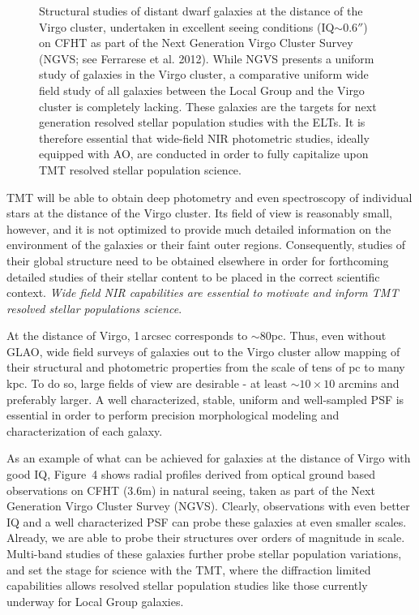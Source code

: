 \begin{figure*}
  \begin{center}
    \caption{Structural studies of distant dwarf galaxies at the
   distance of the Virgo cluster, undertaken in excellent seeing
   conditions (IQ$\sim0.6''$) on CFHT as part of the Next Generation
   Virgo Cluster Survey (NGVS; see Ferrarese et al. 2012). While NGVS
   presents a uniform study of galaxies in the Virgo cluster, a
   comparative uniform wide field study of all galaxies between the
   Local Group and the Virgo cluster is completely lacking. These
   galaxies are the targets for next generation resolved stellar
   population studies with the ELTs. It is therefore essential that
   wide-field NIR photometric studies, ideally equipped with AO, are
   conducted in order to fully capitalize upon TMT resolved stellar
   population science.} 
  \end{center}
\end{figure*}

TMT will be able to obtain deep photometry and even spectroscopy of
individual stars at the distance of the Virgo cluster. Its field of view
is reasonably small, however, and it is not optimized to provide much
detailed information on the environment of the galaxies or their faint
outer regions. Consequently, studies of their global structure need to
be obtained elsewhere in order for forthcoming detailed studies of their
stellar content to be placed in the correct scientific context. {\it
Wide field NIR capabilities are essential to motivate and inform TMT
resolved stellar populations science}. 

At the distance of Virgo, 1\,arcsec corresponds to $\sim 80$pc. Thus,
even without GLAO, wide field surveys of galaxies out to the Virgo
cluster allow mapping of their structural and photometric properties
from the scale of tens of pc to many kpc. To do so, large fields of view
are desirable - at least $\sim 10\times10$ arcmins and preferably
larger. A well characterized, stable, uniform and well-sampled PSF is
essential in order to perform precision morphological modeling and
characterization of each galaxy.

As an example of what can be achieved for galaxies at the distance of
Virgo with good IQ, Figure~4 shows radial profiles derived from optical
ground based observations on CFHT (3.6m) in natural seeing, taken as
part of the Next Generation Virgo Cluster Survey (NGVS). Clearly,
observations with even better IQ and a well characterized PSF can probe
these galaxies at even smaller scales. Already, we are able to probe
their structures over orders of magnitude in scale. Multi-band studies
of these galaxies further probe stellar population variations, and set
the stage for science with the TMT, where the diffraction limited
capabilities allows resolved stellar population studies like those
currently underway for Local Group galaxies. 

